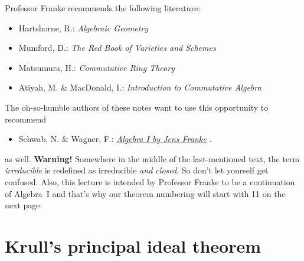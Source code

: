 \documentclass[a4paper,parskip=half,numbers=enddot, DIV=12]{scrreprt}
\begin{document}
Professor Franke recommends the following literature:
\begin{itemize}
	\item Hartshorne, R.: \emph{Algebraic Geometry}
	\item Mumford, D.: \emph{The Red Book of Varieties and Schemes}
	\item Matsumura, H.: \emph{Commutative Ring Theory} \cite{matsumuraCRT}
	\item Atiyah, M. \& MacDonald, I.: \emph{Introduction to Commutative Algebra}
\end{itemize}
The oh-so-humble authors of these notes want to use this opportunity to recommend
\begin{itemize}
	\item Schwab, N. \& Wagner, F.:  \href{https://github.com/Nicholas42/AlgebraFranke/tree/master/AlgebraI}{\emph{Algebra I by Jens Franke}} \cite{alg1}.
\end{itemize}
as well. \textbf{Warning!} Somewhere in the middle of the last-mentioned text, the term \emph{irreducible} is redefined as irreducible \emph{and closed}. So don't let yourself get confused. Also, this lecture is intended by Professor Franke to be a continuation of Algebra~I and that's why our theorem numbering will start with 11 on the next page. 

\chapter{Krull's principal ideal theorem}
\end{document}
